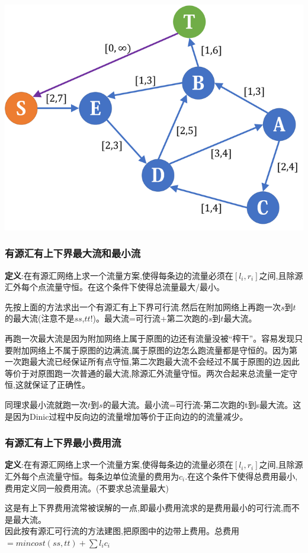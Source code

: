 \documentclass[12pt, a4paper, oneside]{ctexart}
\begin{document}
\centering %
\includegraphics[scale=0.4]{pic3.png}
\flushleft %


\subsubsection{有源汇有上下界最大流和最小流}
\textbf{定义}:在有源汇网络上求一个流量方案,使得每条边的流量必须在$[l_{i},r_{i}]$之间,且除源汇外每个点流量守恒。在这个条件下使得总流量最大/最小。\par
先按上面的方法求出一个有源汇有上下界可行流.然后在附加网络上再跑一次$s$到$t$的最大流(注意不是$ss$,$tt$!)。最大流=可行流+第二次跑的$s$到$t$最大流。\par
再跑一次最大流是因为附加网络上属于原图的边还有流量没被“榨干”。容易发现只要附加网络上不属于原图的边满流,属于原图的边怎么跑流量都是守恒的。因为第一次跑最大流已经保证所有点守恒,第二次跑最大流不会经过不属于原图的边,因此等价于对原图跑一次普通的最大流,除源汇外流量守恒。两次合起来总流量一定守恒,这就保证了正确性。\par
同理求最小流就跑一次$t$到$s$的最大流。最小流=可行流-第二次跑的t到s最大流。这是因为Dinic过程中反向边的流量增加等价于正向边的的流量减少。

\subsubsection{有源汇有上下界最小费用流}
\textbf{定义}:在有源汇网络上求一个流量方案,使得每条边的流量必须在$[l_{i},r_{i}]$之间,且除源汇外每个点流量守恒。每条边单位流量的费用为$c_{i}$.在这个条件下使得总费用最小,费用定义同一般费用流。(不要求总流量最大)\par
这是有上下界费用流常被误解的一点,即最小费用流求的是费用最小的可行流,而不是最大流。\\

因此按有源汇可行流的方法建图,把原图中的边带上费用。总费用$=mincost(ss,tt)+\sum{l_{i}c_{i}}$
\end{document}
